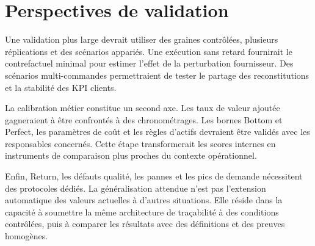 \section{Perspectives de validation}

Une validation plus large devrait utiliser des graines contrôlées, plusieurs réplications et des scénarios appariés. Une exécution sans retard fournirait le contrefactuel minimal pour estimer l'effet de la perturbation fournisseur. Des scénarios multi-commandes permettraient de tester le partage des reconstitutions et la stabilité des KPI clients.

La calibration métier constitue un second axe. Les taux de valeur ajoutée gagneraient à être confrontés à des chronométrages. Les bornes Bottom et Perfect, les paramètres de coût et les règles d'actifs devraient être validés avec les responsables concernés. Cette étape transformerait les scores internes en instruments de comparaison plus proches du contexte opérationnel.

Enfin, Return, les défauts qualité, les pannes et les pics de demande nécessitent des protocoles dédiés. La généralisation attendue n'est pas l'extension automatique des valeurs actuelles à d'autres situations. Elle réside dans la capacité à soumettre la même architecture de traçabilité à des conditions contrôlées, puis à comparer les résultats avec des définitions et des preuves homogènes.
